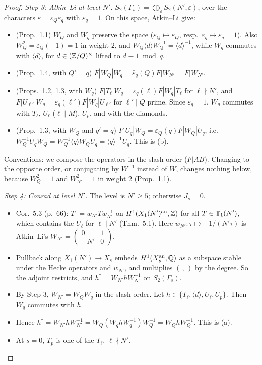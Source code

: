 \begin{proof}
\emph{Step 3: Atkin--Li at level $N'$.} $S_2(\Gamma_s)=\bigoplus_\varepsilon S_2(N',\varepsilon)$, over the characters $\varepsilon=\varepsilon_Q\varepsilon_q$ with
$\varepsilon_q=1$. On this space, Atkin--Li give:
\begin{itemize}
\item (Prop.~1.1) $W_Q$ and $W_q$ preserve the space ($\varepsilon_Q\mapsto\bar\varepsilon_Q$, resp.\ $\varepsilon_q\mapsto\bar\varepsilon_q=1$). Also $W_Q^2=\varepsilon_Q(-1)=1$ in weight $2$, and
  $W_Q\langle d\rangle W_Q^{-1}=\langle d\rangle^{-1}$, while $W_q$ commutes with $\langle d\rangle$, for $d\in(\mathbb{Z}/Q)^\times$ lifted to $d\equiv1\bmod q$.
\item (Prop.~1.4, with $Q'=q$) $F|W_Q|W_q=\bar\varepsilon_q(Q)F|W_{N'}=F|W_{N'}$.
\item (Props.~1.2, 1.3, with $W_q$) $F|T_\ell|W_q=\varepsilon_q(\ell)F|W_q|T_\ell$ for $\ell\nmid N'$, and $F|U_{\ell'}|W_q=\varepsilon_q(\ell')F|W_q|U_{\ell'}$ for $\ell'\mid Q$ prime.
  Since $\varepsilon_q=1$, $W_q$ commutes with $T_\ell$, $U_\ell$ ($\ell\mid M$), $U_p$, and with the diamonds.
\item (Prop.~1.3, with $W_Q$ and $q'=q$) $F|U_q|W_Q=\varepsilon_Q(q)F|W_Q|U_q$, i.e.\ $W_Q^{-1}U_qW_Q=W_Q^{-1}\langle q\rangle W_QU_q=\langle q\rangle^{-1}U_q$.
  This is (b).
\end{itemize}
Conventions: we compose the operators in the slash order ($F|AB$). Changing to the opposite order, or conjugating by $W^{-1}$ instead of $W$, changes nothing below,
because $W_Q^2=1$ and $W_{N'}^2=1$ in weight $2$ (Prop.~1.1).

\emph{Step 4: Conrad at level $N'$.} The level is $N'\ge5$; otherwise $J_s=0$.
\begin{itemize}
\item Cor.~5.3 (p.~66): $T^\dagger=w_{N'}Tw_{N'}^{-1}$ on $H^1(X_1(N')^{\rm an},\mathbb{Z})$ for all $T\in\mathbb{T}_1(N')$, which contains the $U_\ell$ for $\ell\mid N'$ (Thm.~5.1). Here
  $w_{N'}:\tau\mapsto-1/(N'\tau)$ is Atkin--Li's $W_{N'}=\left(\begin{smallmatrix}0&1\\-N'&0\end{smallmatrix}\right)$.
\item Pullback along $X_1(N')\to X_s$ embeds $H^1(X_s^{\rm an},\mathbb{Q})$ as a subspace stable under the Hecke operators and $w_{N'}$, and multiplies $(\,,\,)$ by the degree.
  So the adjoint restricts, and $h^\dagger=W_{N'}hW_{N'}^{-1}$ on $S_2(\Gamma_s)$.
\item By Step 3, $W_{N'}=W_QW_q$ in the slash order. Let $h\in\{T_\ell,\langle d\rangle,U_\ell,U_p\}$. Then $W_q$ commutes with $h$.
\item Hence $h^\dagger=W_{N'}hW_{N'}^{-1}=W_Q(W_qhW_q^{-1})W_Q^{-1}=W_QhW_Q^{-1}$. This is (a).
\item At $s=0$, $T_p$ is one of the $T_\ell$, $\ell\nmid N'$.
\end{itemize}


\end{proof}
